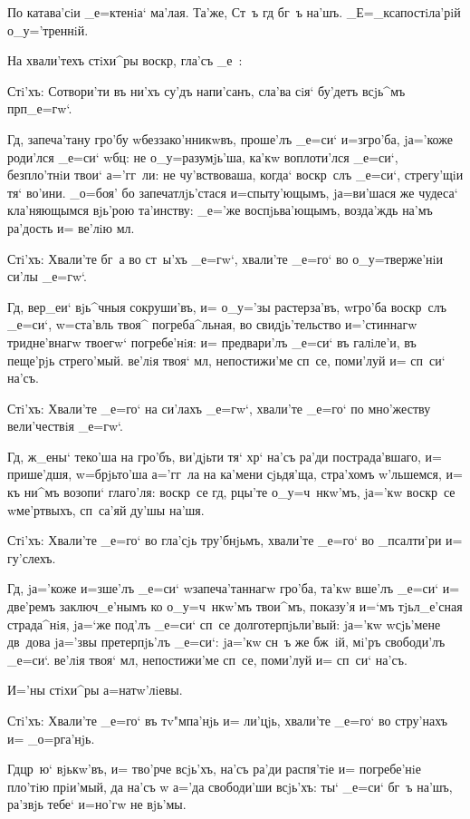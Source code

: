 По катава'сiи _е=ктенiа` ма'лая. Та'же, Ст~ъ гд 
бг~ъ на'шъ. _Е=_ксапостiла'рiй о_у='треннiй. 

На хвали'техъ стiхи^ры воскр, гла'съ _е~:

Стi'хъ: Сотвори'ти въ ни'хъ су'дъ напи'санъ, сла'ва 
сiя` бу'детъ всjь^мъ прп _е=гw`.

Гд, запеча'тану гро'бу w\т беззако'нникwвъ, 
проше'лъ _е=си` и=з\ъ гро'ба, jа='коже роди'лся _е=си` 
w\т бц: не о_у=разумjь'ша, ка'кw воплоти'лся _е=си`, 
безпло'тнiи твои` а='гг~ли: не чу'вствоваша, когда` 
воскр~слъ _е=си`, стрегу'щiи тя` во'ини. _о=боя' бо 
запечатлjь'стася и=спыту'ющымъ, jа=ви'шася же чудеса` 
кла'няющымся вjь'рою та'инству: _е='же воспjьва'ющымъ, 
возда'ждь на'мъ ра'дость и= ве'лiю мл.

Стi'хъ: Хвали'те бг~а во ст~ы'хъ _е=гw`, хвали'те 
_е=го` во о_у=тверже'нiи си'лы _е=гw`.

Гд, вер_еи` вjь^чныя сокруши'въ, и= о_у='зы 
растерза'въ, w\т гро'ба воскр~слъ _е=си`, w=ста'вль твоя^ 
погреба^льная, во свидjь'тельство и='стиннагw 
тридне'внагw твоегw` погребе'нiя: и= предвари'лъ _е=си` 
въ галiле'и, въ пеще'рjь стрего'мый. ве'лiя твоя` мл, 
непостижи'ме сп~се, поми'луй и= сп~си` на'съ.

Стi'хъ: Хвали'те _е=го` на си'лахъ _е=гw`, хвали'те 
_е=го` по мно'жеству вели'чествiя _е=гw`.

Гд, ж_ены` теко'ша на гро'бъ, ви'дjьти тя` хр` 
на'съ ра'ди пострада'вшаго, и= прише'дшя, w=брjьто'ша 
а='гг~ла на ка'мени сjьдя'ща, стра'хомъ w'льшемся, и= 
къ ни^мъ возопи` глаго'ля: воскр~се гд, рцы'те 
о_у=ч~нкw'мъ, jа='кw воскр~се w\т ме'ртвыхъ, сп~са'яй 
ду'шы на'шя.

Стi'хъ: Хвали'те _е=го` во гла'сjь тру'бнjьмъ, 
хвали'те _е=го` во _псалти'ри и= гу'слехъ.

Гд, jа='коже и=зше'лъ _е=си` w\т запеча'таннагw 
гро'ба, та'кw вше'лъ _е=си` и= две'ремъ заключ_е'нымъ ко 
о_у=ч~нкw'мъ твои^мъ, показу'я и=`мъ тjьл_е'сная 
страда^нiя, jа=`же под'лъ _е=си` сп~се 
долготерпjьли'вый: jа='кw w\т сjь'мене дв~дова jа='звы 
претерпjь'лъ _е=си`: jа='кw сн~ъ же бж~iй, мi'ръ 
свободи'лъ _е=си`. ве'лiя твоя` мл, непостижи'ме 
сп~се, поми'луй и= сп~си` на'съ. 

И='ны стiхи^ры а=натw'лiевы.

Стi'хъ: Хвали'те _е=го` въ тv"мпа'нjь и= ли'цjь, 
хвали'те _е=го` во стру'нахъ и= _о=рга'нjь.

Гд цр~ю` вjькw'въ, и= тво'рче всjь'хъ, на'съ ра'ди 
распя'тiе и= погребе'нiе пло'тiю прiи'мый, да на'съ w\т 
а='да свободи'ши всjь'хъ: ты` _е=си` бг~ъ на'шъ, ра'звjь 
тебе` и=но'гw не вjь'мы.

